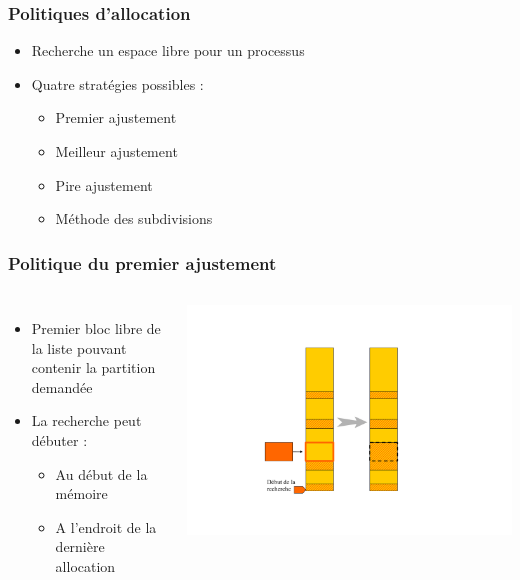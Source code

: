 \begin{frame}
\frametitle{Politiques d’allocation}
\begin{itemize}
\item Recherche un espace libre pour un processus
\item Quatre stratégies possibles :
\begin{itemize}
\item Premier ajustement
\item Meilleur ajustement
\item Pire ajustement
\item Méthode des subdivisions
\end{itemize}
\end{itemize}
\end{frame}

\begin{frame}
\frametitle{Politique du premier ajustement}
\begin{columns}
\begin{itemize}
\item Premier bloc libre de la liste pouvant contenir la partition demandée
\item La recherche peut débuter :
\begin{itemize}
\item Au début de la mémoire
\item A l'endroit de la dernière allocation
\end{itemize}
\end{itemize}
\includegraphics[height=.6\textheight]{../illustration/memoire_principale_premier_ajustement.pdf}
\end{columns}
\end{frame}


